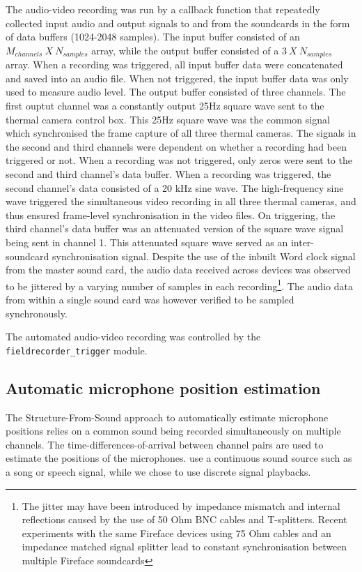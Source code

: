 \documentclass[
]{book}
\begin{document}
The audio-video recording was run by a callback function that repeatedly collected input audio and output signals to and from the soundcards in the form of data buffers (1024-2048 samples). The input buffer consisted of an \(M_{channels} \:X \:N_{samples}\) array, while the output buffer consisted of a \(3 \:X \:N_{samples}\) array. When a recording was triggered, all input buffer data were concatenated and saved into an audio file. When not triggered, the input buffer data was only used to measure audio level. The output buffer consisted of three channels. The first ouptut channel was a constantly output 25Hz square wave
sent to the thermal camera control box. This 25Hz square wave was the common signal which synchronised the frame capture of all three thermal cameras. The signals in the second and third channels were dependent on whether
a recording had been triggered or not. When a recording was not triggered, only zeros were sent to the second and third channel's data buffer. When a recording was triggered, the second channel's data consisted of a 20 kHz sine wave. The high-frequency sine wave triggered the simultaneous video recording in all three thermal cameras, and thus ensured frame-level synchronisation in the video files. On triggering, the third channel's data buffer was an attenuated version of the square wave signal being sent in channel 1. This attenuated square wave served as an inter-soundcard synchronisation signal. Despite the use of the inbuilt Word clock signal from the master sound card, the audio data received across devices was observed to be jittered by a varying number of samples in each recording\footnote{The jitter may have been introduced by impedance mismatch and internal reflections caused by the use of 50 Ohm BNC cables and T-splitters. Recent experiments with the same Fireface devices using 75 Ohm cables and an impedance matched signal splitter lead to constant synchronisation between multiple Fireface soundcards}. The audio data from within a single sound card was however verified to be sampled synchronously.

The automated audio-video recording was controlled by the \texttt{fieldrecorder\_trigger} module.

\hypertarget{automicpos}{%
\subsection{Automatic microphone position estimation}\label{automicpos}}

The Structure-From-Sound approach \citep{zhayida2016automatic} to automatically estimate microphone positions relies on a common sound being recorded simultaneously on multiple channels. The time-differences-of-arrival between channel pairs are used to estimate the positions of the microphones. \citet{zhayida2016automatic} use a continuous sound source such as a song or speech signal, while we chose to use discrete signal playbacks.
\end{document}
